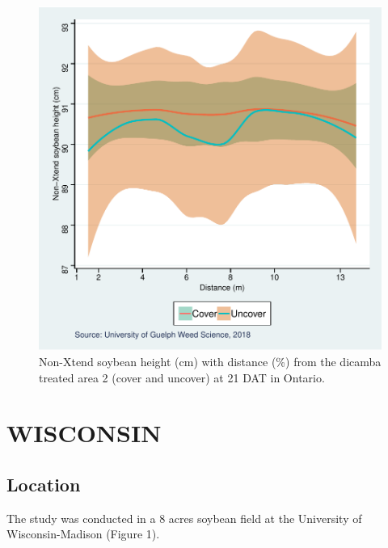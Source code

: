 \documentclass[]{article}
\begin{document}
\begin{figure}
\centering
\includegraphics{Report_Dicamba_study_files/figure-latex/unnamed-chunk-87-1.pdf}
\caption{Non-Xtend soybean height (cm) with distance (\%) from the
dicamba treated area 2 (cover and uncover) at 21 DAT in Ontario.}
\end{figure}

\newpage

\pagebreak

\section{WISCONSIN}\label{wisconsin-1}

\subsection{Location}\label{location-5}

The study was conducted in a 8 acres soybean field at the University of
Wisconsin-Madison (Figure 1).
\end{document}

